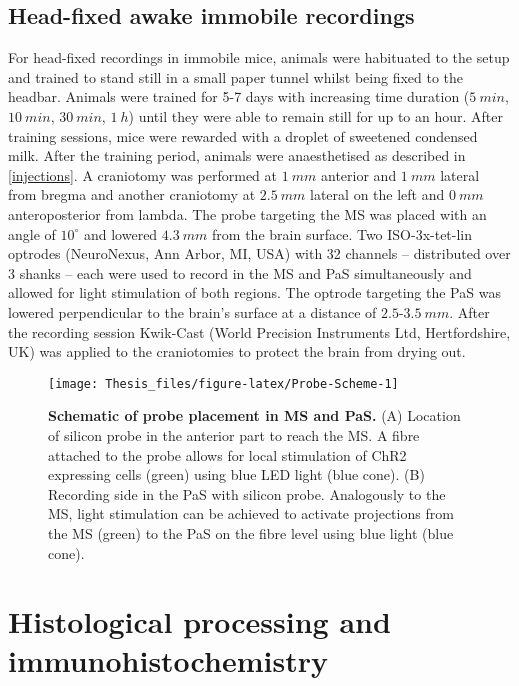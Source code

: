 \documentclass[
  12pt,
  a4paper,
  openany]{book}
\begin{document}
\hypertarget{immobile}{%
\subsection{Head-fixed awake immobile recordings}\label{immobile}}

For head-fixed recordings in immobile mice, animals were habituated to the setup and trained to stand still in a small paper tunnel whilst being fixed to the headbar. Animals were trained for 5-7 days with increasing time duration (\(5\ min\), \(10\ min\), \(30\ min\), \(1\ h\)) until they were able to remain still for up to an hour. After training sessions, mice were rewarded with a droplet of sweetened condensed milk. After the training period, animals were anaesthetised as described in \ref{injections}. A craniotomy was performed at \(1\ mm\) anterior and \(1\ mm\) lateral from bregma and another craniotomy at \(2.5\ mm\) lateral on the left and \(0\ mm\) anteroposterior from lambda. The probe targeting the MS was placed with an angle of \(10^{\circ}\) and lowered \(4.3\ mm\) from the brain surface. Two ISO-3x-tet-lin optrodes (NeuroNexus, Ann Arbor, MI, USA) with 32 channels -- distributed over \(3\) shanks -- each were used to record in the MS and PaS simultaneously and allowed for light stimulation of both regions. The optrode targeting the PaS was lowered perpendicular to the brain's surface at a distance of \(2.5\)-\(3.5\ mm\). After the recording session Kwik-Cast (World Precision Instruments Ltd, Hertfordshire, UK) was applied to the craniotomies to protect the brain from drying out.




\begin{figure}[H]

{\centering \texttt{[image: Thesis\_files/figure-latex/Probe-Scheme-1]} 

}

\caption[Schematic of probe placement in MS and PaS]{\textbf{Schematic of probe placement in MS and PaS.} (A) Location of silicon probe in the anterior part to reach the MS. A fibre attached to the probe allows for local stimulation of ChR2 expressing cells (green) using blue LED light (blue cone). (B) Recording side in the PaS with silicon probe. Analogously to the MS, light stimulation can be achieved to activate projections from the MS (green) to the PaS on the fibre level using blue light (blue cone).}\label{fig:Probe-Scheme}
\end{figure}

\hypertarget{histological-processing-and-immunohistochemistry}{%
\section{Histological processing and immunohistochemistry}\label{histological-processing-and-immunohistochemistry}}
\end{document}
